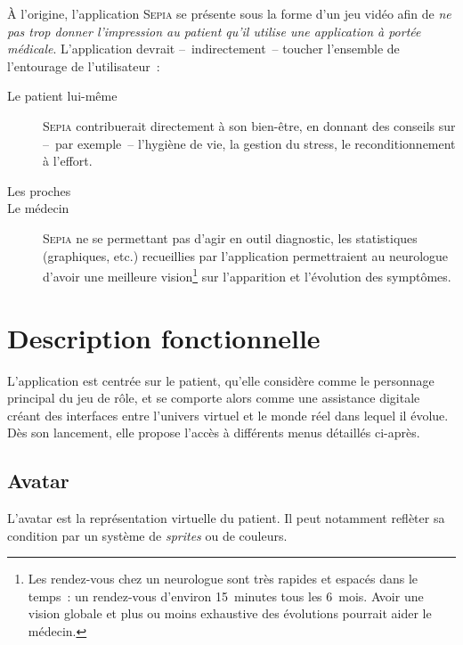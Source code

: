 \documentclass[a4paper,12pt,francais]{article}
\newcommand{\Sepia}{\textsc{Sepia}\xspace}
\begin{document}
À l’origine, l’application \Sepia{} se présente sous la forme d’un jeu vidéo afin de \emph{ne pas trop donner l’impression au patient qu’il utilise une application à portée médicale}. L’application devrait –~indirectement~– toucher l’ensemble de l’entourage de l’utilisateur~:
\begin{description}
    \item[Le patient lui-même] \Sepia{} contribuerait directement à son bien-être, en donnant des conseils sur –~par exemple~– l’hygiène de vie, la gestion du stress, le reconditionnement à l’effort.
    \item[Les proches] %
    \item[Le médecin] \Sepia{} ne se permettant pas d’agir en outil diagnostic, les statistiques (graphiques, etc.) recueillies par l’application permettraient au neurologue d’avoir une meilleure vision\footnote{Les rendez-vous chez un neurologue sont très rapides et espacés dans le temps~: un rendez-vous d’environ 15~minutes tous les 6~mois. Avoir une vision globale et plus ou moins exhaustive des évolutions pourrait aider le médecin.} sur l’apparition et l’évolution des symptômes.
\end{description}

\section{Description fonctionnelle}

L'application est centrée sur le patient, qu'elle considère comme le personnage principal du jeu de rôle, et se comporte alors comme une assistance digitale créant des interfaces entre l'univers virtuel et le monde réel dans lequel il évolue. Dès son lancement, elle propose l'accès à différents menus détaillés ci-après.

\subsection{Avatar}

L'avatar est la représentation virtuelle du patient. Il peut notamment reflèter sa condition par un système de \textit{sprites} ou de couleurs.

\end{document}
